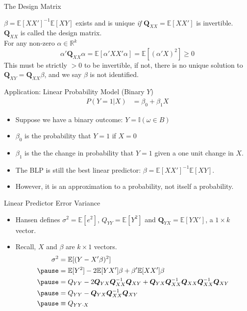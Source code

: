 \documentclass[aspectratio=169]{beamer}
\numberwithin{equation}{section}
\begin{document}
\begin{frame}{The Design Matrix}

$\beta = \mathbb{E}[XX']^{-1}\mathbb{E}[XY]$ exists and is unique \emph{if} $\mathbf{Q}_{XX}=\mathbb{E}[XX']$ is invertible.\\
\bigskip
$\mathbf{Q}_{XX}$ is called the design matrix.\\
\bigskip
For any non-zero $\alpha \in \mathbb{R}^k$
$$\alpha'\bm{Q}_{XX}\alpha=\mathbb{E}[\alpha'XX'\alpha]=\mathbb{E}[(\alpha'X)^2] \geq 0$$
This must be strictly $>0$ to be invertible, if not, there is no unique solution to $\mathbf{Q}_{XY}=\mathbf{Q}_{XX}\beta$, and we say $\beta$ is not identified.
\end{frame}


\begin{frame}{Application: Linear Probability Model (Binary $Y$)}
\begin{align*}
P(Y=1|X)&=\beta_0+\beta_1X
\end{align*}
\begin{itemize}
\item Suppose we have a binary outcome: $Y=\mathbb{I}(\omega\in B)$
\item $\beta_0$ is the probability that $Y=1$ if $X=0$
\item $\beta_1$ is the the change in probability that $Y=1$ given a one unit change in $X$.
\item The BLP is still the best linear predictor: $\beta=\mathbb{E}[XX']^{-1}\mathbb{E}[XY]$.
\item However, it is an approximation to a probability, not itself a probability.
\end{itemize}
\end{frame}


\begin{frame}{Linear Predictor Error Variance}
\begin{itemize}
\item Hansen defines $\sigma^2=\mathbb{E}[e^2]$, $Q_{YY}=\mathbb{E}[Y^2]$ and $\mathbf{Q}_{YX}=\mathbb{E}[YX']$, a $1\times k$ vector.
\item Recall, $X$ and  $\beta$ are $k\times 1$ vectors.
\begin{align*}
\sigma^2&=\mathbb{E}[(Y-X'\beta)^2]\\ \pause
&=\mathbb{E}[Y^2]-2\mathbb{E}[YX']\beta+\beta'\mathbb{E}[XX']\beta\\\pause
&=Q_{YY}-2\bm{Q}_{YX}\bm{Q}^{-1}_{XX}\bm{Q}_{XY}+\bm{Q}_{YX}\bm{Q}^{-1}_{XX}\bm{Q}_{XX}\bm{Q}^{-1}_{XX}\bm{Q}_{XY}\\\pause
&=Q_{YY}-\bm{Q}_{YX}\bm{Q}^{-1}_{XX}\bm{Q}_{XY}\\\pause
&\equiv Q_{YY\cdot X}
\end{align*}
\end{itemize}
\end{frame}
\end{document}
